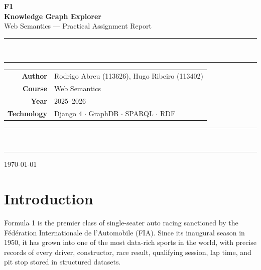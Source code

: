 \documentclass[12pt,a4paper]{article}
\begin{document}

\begin{titlepage}
  \centering
  \vspace*{1.5cm}

  {\fontsize{48}{52}\selectfont\bfseries\color{f1red} F\textcolor{black}{1}}\\[0.4cm]
  {\Large\bfseries Knowledge Graph Explorer}\\[0.3cm]
  {\large\color{darkgray} Web Semantics --- Practical Assignment Report}

  \vspace{1.5cm}
  \color{darkgray}\rule{0.4\linewidth}{2pt}\\[0.1cm]
  \color{darkgray}\rule{\linewidth}{0.4pt}
  \vspace{1cm}

  \begin{tabular}{rl}
    \textbf{Author}      & Rodrigo Abreu (113626), Hugo Ribeiro (113402) \\[0.3em]
    \textbf{Course}      & Web Semantics \\[0.3em]
    \textbf{Year}        & 2025--2026 \\[0.3em]
    \textbf{Technology}  & Django 4 $\cdot$ GraphDB $\cdot$ SPARQL $\cdot$ RDF \\
  \end{tabular}

  \vspace{1.5cm}
  \color{darkgray}\rule{\linewidth}{0.4pt}\\[0.1cm]
  \color{darkgray}\rule{0.4\linewidth}{2pt}

  \vfill
  {\small\color{darkgray}\today}
\end{titlepage}

\tableofcontents
\newpage

\section{Introduction}

Formula 1 is the premier class of single-seater auto racing sanctioned by the
Fédération Internationale de l'Automobile (FIA). Since its inaugural season in
1950, it has grown into one of the most data-rich sports in the world, with
precise records of every driver, constructor, race result, qualifying session,
lap time, and pit stop stored in structured datasets.
\end{document}

